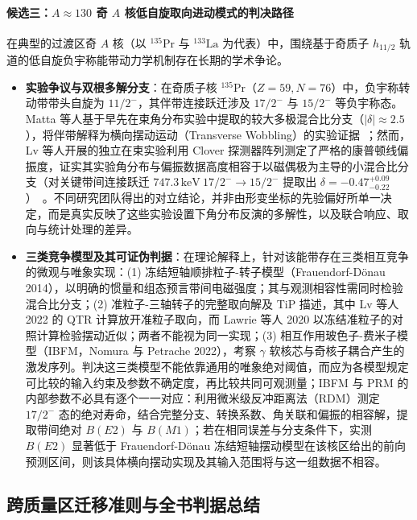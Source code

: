 \paragraph{候选三：$A \approx 130$ 奇 $A$ 核低自旋取向进动模式的判决路径}
在典型的过渡区奇 $A$ 核（以 $^{135}\mathrm{Pr}$ 与 $^{133}\mathrm{La}$ 为代表）中，围绕基于奇质子 $h_{11/2}$ 轨道的低自旋负宇称能带动力学机制存在长期的学术争论。\cite{lawrie-2020-tilted-precession-wobbling,frauendorf-2014-transverse-wobbling,nomura-2022-questioning-wobbling-ibfm,lv-2022-evidence-against-wobbling-135pr,matta-2015-transverse-wobbling-135pr}
\begin{itemize}
\item \textbf{实验争议与双根多解分支}：在奇质子核 $^{135}\mathrm{Pr}$（$Z=59, N=76$）中，负宇称转动带带头自旋为 $11/2^-$，其伴带连接跃迁涉及 $17/2^-$ 与 $15/2^-$ 等负宇称态。Matta 等人基于早先在束角分布实验中提取的较大多极混合比分支（$|\delta| \approx 2.5$），将伴带解释为横向摆动运动（Transverse Wobbling）的实验证据~\cite{matta-2015-transverse-wobbling-135pr}；然而，Lv 等人开展的独立在束实验利用 Clover 探测器阵列测定了严格的康普顿线偏振度，证实其实验角分布与偏振数据高度相容于以磁偶极为主导的小混合比分支（对关键带间连接跃迁 $747.3\,\mathrm{keV}\ 17/2^- \to 15/2^-$ 提取出 $\delta = -0.47^{+0.09}_{-0.22}$）~\cite{lv-2022-evidence-against-wobbling-135pr}。不同研究团队得出的对立结论，并非由形变坐标的先验偏好所单一决定，而是真实反映了这些实验设置下角分布反演的多解性，以及联合响应、取向与统计处理的差异。
\item \textbf{三类竞争模型及其可证伪判据}：在理论解释上，针对该能带存在三类相互竞争的微观与唯象实现：(1) 冻结短轴顺排粒子-转子模型（Frauendorf-Dönau 2014），以明确的惯量和组态预言带间电磁强度；其与观测相容性需同时检验混合比分支；(2) 准粒子-三轴转子的完整取向解及 TiP 描述，其中 Lv 等人 2022 的 QTR 计算放开准粒子取向，而 Lawrie 等人 2020 以冻结准粒子的对照计算检验摆动近似；两者不能视为同一实现；(3) 相互作用玻色子-费米子模型（IBFM，Nomura 与 Petrache 2022），考察 $\gamma$ 软核芯与奇核子耦合产生的激发序列。判决这三类模型不能依靠通用的唯象绝对阈值，而应为各模型规定可比较的输入约束及参数不确定度，再比较共同可观测量；IBFM 与 PRM 的内部参数不必具有逐个一一对应：利用微米级反冲距离法（RDM）测定 $17/2^-$ 态的绝对寿命，结合完整分支、转换系数、角关联和偏振的相容解，提取带间绝对 $B(E2)$ 与 $B(M1)$；若在相同误差与分支条件下，实测 $B(E2)$ 显著低于 Frauendorf-Dönau 冻结短轴摆动模型在该核区给出的前向预测区间，则该具体横向摆动实现及其输入范围将与这一组数据不相容。
\end{itemize}

\subsection{跨质量区迁移准则与全书判据总结}\label{sec:3-8-5}

